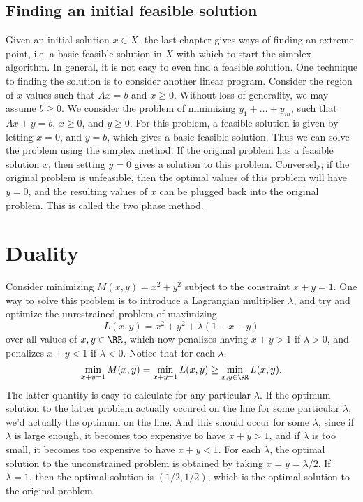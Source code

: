 \section{Finding an initial feasible solution}

Given an initial solution $x \in X$, the last chapter gives ways of finding an extreme point, i.e. a basic feasible solution in $X$ with which to start the simplex algorithm. In general, it is not easy to even find a feasible solution. One technique to finding the solution is to consider another linear program. Consider the region of $x$ values such that $Ax = b$ and $x \geq 0$. Without loss of generality, we may assume $b \geq 0$. We consider the problem of minimizing $y_1 + \dots + y_m$, such that $Ax + y = b$, $x \geq 0$, and $y \geq 0$. For this problem, a feasible solution is given by letting $x = 0$, and $y = b$, which gives a basic feasible solution. Thus we can solve the problem using the simplex method. If the original problem has a feasible solution $x$, then setting $y = 0$ gives a solution to this problem. Conversely, if the original problem is unfeasible, then the optimal values of this problem will have $y = 0$, and the resulting values of $x$ can be plugged back into the original problem. This is called the two phase method.






\chapter{Duality}

Consider minimizing $M(x,y) = x^2 + y^2$ subject to the constraint $x + y = 1$. One way to solve this problem is to introduce a Lagrangian multiplier $\lambda$, and try and optimize the unrestrained problem of maximizing
%
\[ L(x,y) = x^2 + y^2 + \lambda (1 - x - y) \]
%
over all values of $x, y \in \RR$, which now penalizes having $x + y > 1$ if $\lambda > 0$, and penalizes $x + y < 1$ if $\lambda < 0$. Notice that for each $\lambda$,
%
\[ \min_{x + y = 1} M(x,y) = \min_{x + y = 1} L(x,y) \geq \min_{x,y \in \RR} L(x,y). \]
%
The latter quantity is easy to calculate for any particular $\lambda$. If the optimum solution to the latter problem actually occured on the line for some particular $\lambda$, we'd actually the optimum on the line. And this should occur for some $\lambda$, since if $\lambda$ is large enough, it becomes too expensive to have $x + y > 1$, and if $\lambda$ is too small, it becomes too expensive to have $x + y < 1$. For each $\lambda$, the optimal solution to the unconstrained problem is obtained by taking $x = y = \lambda/2$. If $\lambda = 1$, then the optimal solution is $(1/2,1/2)$, which is the optimal solution to the original problem.

